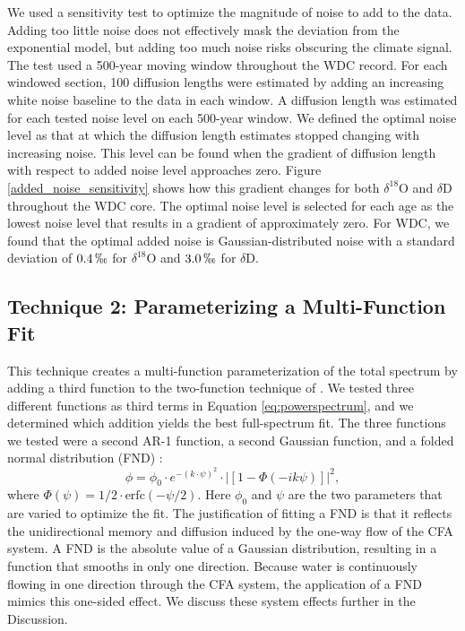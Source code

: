 \documentclass[draft, jgrga]{AGUTeX}
\begin{document}
\begin{article}
We used a sensitivity test to optimize the magnitude of noise to add to the data. Adding too little noise does not effectively mask the deviation from the exponential model, but adding too much noise risks obscuring the climate signal. The test used a 500-year moving window throughout the WDC record. For each windowed section, 100 diffusion lengths were estimated by adding an increasing white noise baseline to the data in each window. A diffusion length was estimated for each tested noise level on each 500-year window. We defined the optimal noise level as that at which the diffusion length estimates stopped changing with increasing noise. This level can be found when the gradient of diffusion length with respect to added noise level approaches zero. Figure \ref{added_noise_sensitivity} shows how this gradient changes for both $\delta^{18}$O and $\delta$D throughout the WDC core. The optimal noise level is selected for each age as the lowest noise level that results in a gradient of approximately zero. For WDC, we found that the optimal added noise is Gaussian-distributed noise with a standard deviation of $0.4 \, \permil$ for $\delta^{18}$O and $3.0 \,\permil$ for $\delta$D.

\subsection{Technique 2: Parameterizing a Multi-Function Fit}
This technique creates a multi-function parameterization of the total spectrum by adding a third function to the two-function technique of \citet{Gkinis2014}. We tested three different functions as third terms in Equation \ref{eq:powerspectrum}, and we determined which addition yields the best full-spectrum fit. The three functions we tested were a second AR-1 function, a second Gaussian function, and a folded normal distribution (FND) \citep{Tsagris2014}:
\begin{equation}
\phi = \phi_{0} \cdot e^{-(k \cdot \psi)^2} \cdot |\left[1 - \Phi(-i k \psi)\right]|^2,
\end{equation}
where $\Phi(\psi) = 1/2\cdot \mathrm{erfc}(-\psi/2) $. Here $\phi_0$ and $\psi$ are the two parameters that are varied to optimize the fit. The justification of fitting a FND is that it reflects the unidirectional memory and diffusion induced by the one-way flow of the CFA system. A FND is the absolute value of a Gaussian distribution, resulting in a function that smooths in only one direction. Because water is continuously flowing in one direction through the CFA system, the application of a FND mimics this one-sided effect. We discuss these system effects further in the Discussion.


\end{article}
\end{document}
